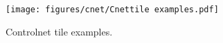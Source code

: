 \begin{figure}
    \centering
      \texttt{[image: figures/cnet/Cnettile examples.pdf]}
      \caption{Controlnet tile examples.}
      \label{fig:cnettile}
\end{figure}
